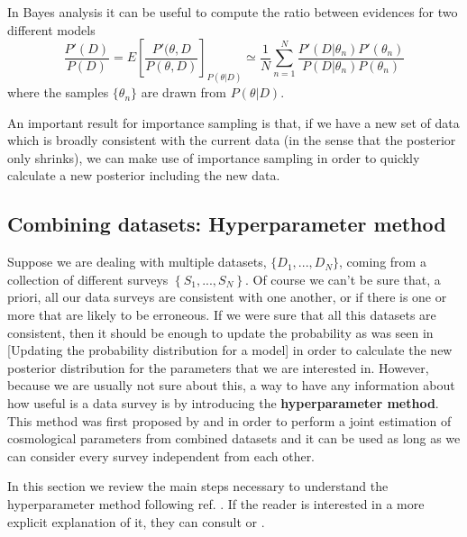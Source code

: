 \documentclass[onecolumn,           %
               showpacs,            %
               preprintnumbers,     %
               aps,                 %
               prl,          	    %
               letterpaper,             %
               superscriptaddress,      %
               nofootinbib,         %
               tightenlines,        %
               floats,floatfix      %
               ,usenatbib,
               ]{revtex4-1}
\begin{document}
In Bayes analysis it can be useful to compute the ratio between evidences for two different models
\begin{equation}\label{importanceratio}
\frac{P'(D)}{P(D)}=E\left[\frac{P'(\theta,D}{P(\theta,D)}\right]_{P(\theta|D)}\simeq \frac{1}{N}\sum_{n=1}^N\frac{P'(D|\theta_n)P'(\theta_n)}{P(D|\theta_n)P(\theta_n)}
\end{equation}
where the samples $\lbrace\theta_n\rbrace$ are drawn from $P(\theta|D)$.

An important result for importance sampling is that, if we have a new set of data which is broadly consistent with the current data (in the sense that the posterior only shrinks), we can make use of importance sampling in order to quickly calculate a new posterior including the new data.
\subsection{Combining datasets: Hyperparameter method}

Suppose we are dealing with multiple datasets,  $\lbrace D_1,...,D_N\rbrace$, coming from a collection of different surveys $\left\lbrace S_1,...,S_N\right\rbrace$. Of course we can't be sure that, a priori, all our data surveys are consistent with one another, or if there is one or more that are likely to be erroneous. If we were sure that all this datasets are consistent, then it should be enough to update the probability as was seen in [Updating the probability distribution for a model] in order to calculate the new posterior distribution for the parameters that we are interested in. However, because we are usually not sure about this, a way to have any information about how useful is a data survey is by introducing the \textbf{hyperparameter method}. This method was first proposed by \cite{hiperp} and \cite{hiperp1} in order to perform a joint estimation of cosmological parameters from combined datasets and it can be used as long as we can consider every survey independent from each other.

In this section we review the main steps necessary to understand the hyperparameter method following ref. \cite{hiperp1}. If the reader is interested in a more explicit explanation of it, they can consult \cite{hiperp} or \cite{hiperp1}.
\end{document}

